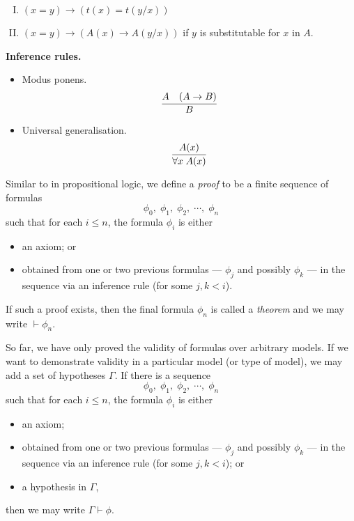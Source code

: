 \begin{mdframed}[linewidth=1pt]
\begin{enumerate}[I.]
    \item \((x = y) \rightarrow (t(x) = t(y/x))\)

    \item \((x = y) \rightarrow (A(x) \rightarrow A(y/x))\)\;\; if \(y\) is substitutable for \(x\) in \(A\).
\end{enumerate}

\vspace{1em}
\textbf{Inference rules.}

\begin{itemize}
    \item Modus ponens.
    \[
    \infer{B}{
        A
        &
        (A\rightarrow B)
    }
    \]

    \item Universal generalisation.
    \[\infer{\forall x\; A(x)}{A(x)}\]
\end{itemize}
\end{mdframed}
\vspace{1em}

Similar to in propositional logic, we define a \emph{proof} to be a finite sequence of formulas
%
\[\phi_0,\; \phi_1,\; \phi_2,\; \cdots,\; \phi_n\]
%
such that for each \(i \leq n\), the formula \(\phi_i\) is either
%
\begin{itemize}
    \item an axiom; or
    \item obtained from one or two previous formulas --- \(\phi_j\) and possibly \(\phi_k\) --- in the sequence via an inference rule (for some \(j, k < i\)).
\end{itemize}
%
If such a proof exists, then the final formula \(\phi_n\) is called a \emph{theorem} and we may write \(\vdash \phi_n\).

So far, we have only proved the validity of formulas over arbitrary models. If we want to demonstrate validity in a particular model (or type of model), we may add a set of hypotheses \(\Gamma\). If there is a sequence
%
\[\phi_0,\; \phi_1,\; \phi_2,\; \cdots,\; \phi_n\]
%
such that for each \(i \leq n\), the formula \(\phi_i\) is either
%
\begin{itemize}
    \item an axiom;
    \item obtained from one or two previous formulas --- \(\phi_j\) and possibly \(\phi_k\) --- in the sequence via an inference rule (for some \(j, k < i\)); or
    \item a hypothesis in \(\Gamma\),
\end{itemize}
%
then we may write \(\Gamma\vdash\phi\).

